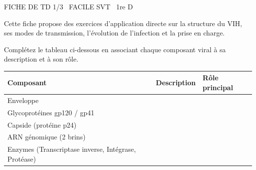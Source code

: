 \documentclass[11pt]{article}
\begin{document}
\begin{tcolorbox}[enhanced,colback=popink,colframe=popink,arc=10pt,boxrule=0pt,left=12pt,right=12pt,top=9pt,bottom=9pt]
{\color{white}\popxbold\small FICHE DE TD 1/3 \textbullet\ FACILE \hfill SVT \textbullet\ 1re D\par}
\end{tcolorbox}
\vspace{4pt}
Cette fiche propose des exercices d'application directe sur la structure du VIH, ses modes de transmission, l'évolution de l'infection et la prise en charge.

\begin{exercice}
Complétez le tableau ci-dessous en associant chaque composant viral à sa description et à son rôle.
\begin{tabular}{|p{3.5cm}|p{5.5cm}|p{5.5cm}|}
\hline
\textbf{Composant} & \textbf{Description} & \textbf{Rôle principal} \\
\hline
Enveloppe & \dotfill & \dotfill \\
\hline
Glycoprotéines gp120 / gp41 & \dotfill & \dotfill \\
\hline
Capside (protéine p24) & \dotfill & \dotfill \\
\hline
ARN génomique (2 brins) & \dotfill & \dotfill \\
\hline
Enzymes (Transcriptase inverse, Intégrase, Protéase) & \dotfill & \dotfill \\
\hline
\end{tabular}
\end{exercice}
\end{document}
